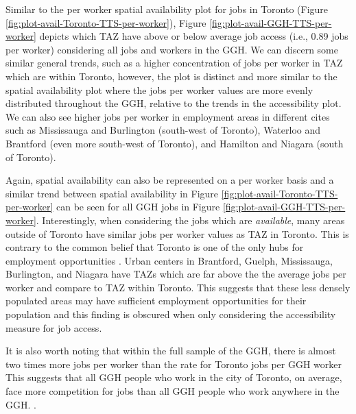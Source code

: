 \documentclass[]{elsarticle} %
\begin{document}
\newpage

Similar to the per worker spatial availability plot for jobs in Toronto
(Figure \ref{fig:plot-avail-Toronto-TTS-per-worker}), Figure
\ref{fig:plot-avail-GGH-TTS-per-worker} depicts which TAZ have above or
below average job access (i.e., 0.89 jobs per worker) considering all
jobs and workers in the GGH. We can discern some similar general trends,
such as a higher concentration of jobs per worker in TAZ which are
within Toronto, however, the plot is distinct and more similar to the
spatial availability plot where the jobs per worker values are more
evenly distributed throughout the GGH, relative to the trends in the
accessibility plot. We can also see higher jobs per worker in employment
areas in different cites such as Mississauga and Burlington (south-west
of Toronto), Waterloo and Brantford (even more south-west of Toronto),
and Hamilton and Niagara (south of Toronto).

Again, spatial availability can also be represented on a per worker
basis and a similar trend between spatial availability in Figure
\ref{fig:plot-avail-Toronto-TTS-per-worker} can be seen for all GGH jobs
in Figure \ref{fig:plot-avail-GGH-TTS-per-worker}. Interestingly, when
considering the jobs which are \emph{available}, many areas outside of
Toronto have similar jobs per worker values as TAZ in Toronto. This is
contrary to the common belief that Toronto is one of the only hubs for
employment opportunities . Urban centers in Brantford, Guelph,
Mississauga, Burlington, and Niagara have TAZs which are far above the
the average jobs per worker and compare to TAZ within Toronto. This
suggests that these less densely populated areas may have sufficient
employment opportunities for their population and this finding is
obscured when only considering the accessibility measure for job access.

It is also worth noting that within the full sample of the GGH, there is
almost two times more jobs per worker than the rate for Toronto jobs per
GGH worker This suggests that all GGH people who work in the city of
Toronto, on average, face more competition for jobs than all GGH people
who work anywhere in the GGH. .
\end{document}
